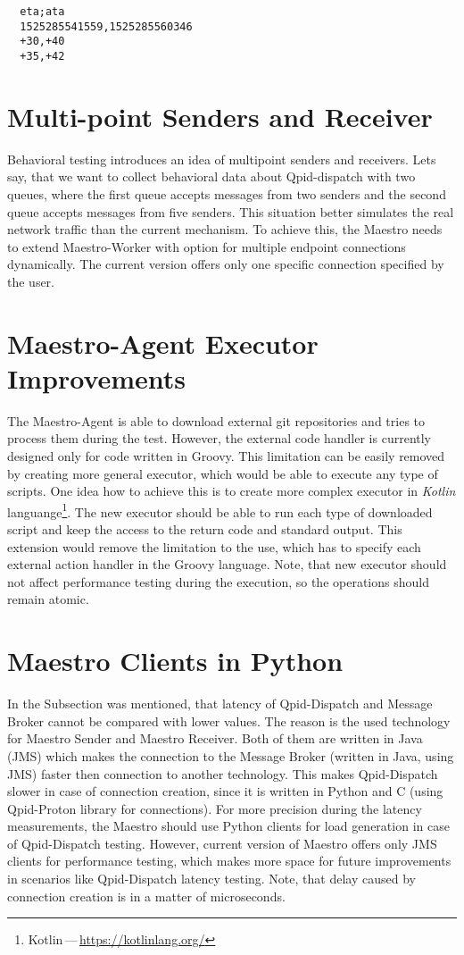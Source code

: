 \begin{verbatim}
  eta;ata
  1525285541559,1525285560346
  +30,+40
  +35,+42
\end{verbatim}

\section{Multi-point Senders and Receiver}
Behavioral testing introduces an idea of multipoint senders and receivers. Lets say, that we want to collect behavioral data about Qpid-dispatch with two queues, where the first queue accepts messages from two senders and the second queue accepts messages from five senders. This situation better simulates the real network traffic than the current mechanism. To achieve this, the Maestro needs to extend Maestro-Worker with option for multiple endpoint connections dynamically. The current version offers only one specific connection specified by the user.

\section{Maestro-Agent Executor Improvements}
The Maestro-Agent is able to download external git repositories and tries to process them during the test. However, the external code handler is currently designed only for code written in Groovy. This limitation can be easily removed by creating more general executor, which would be able to execute any type of scripts. One idea how to achieve this is to create more complex executor in \emph{Kotlin} languange\footnote{Kotlin\,---\,\url{https://kotlinlang.org/}}. The new executor should be able to run each type of downloaded script and keep the access to the return code and standard output. This extension would remove the limitation to the use, which has to specify each external action handler in the Groovy language. Note, that new executor should not affect performance testing during the execution, so the operations should remain atomic.

\section{Maestro Clients in Python}
\label{Maestro Clients in Python}
In the Subsection \label{Latency} was mentioned, that latency of Qpid-Dispatch and Message Broker cannot be compared with lower values. The reason is the used technology for Maestro Sender and Maestro Receiver. Both of them are written in Java (JMS) which makes the connection to the Message Broker (written in Java, using JMS) faster then connection to another technology. This makes Qpid-Dispatch slower in case of connection creation, since it is written in Python and C (using Qpid-Proton library for connections). For more precision during the latency measurements, the Maestro should use Python clients for load generation in case of Qpid-Dispatch testing. However, current version of Maestro offers only JMS clients for performance testing, which makes more space for future improvements in scenarios like Qpid-Dispatch latency testing. Note, that delay caused by connection creation is in a matter of microseconds.
